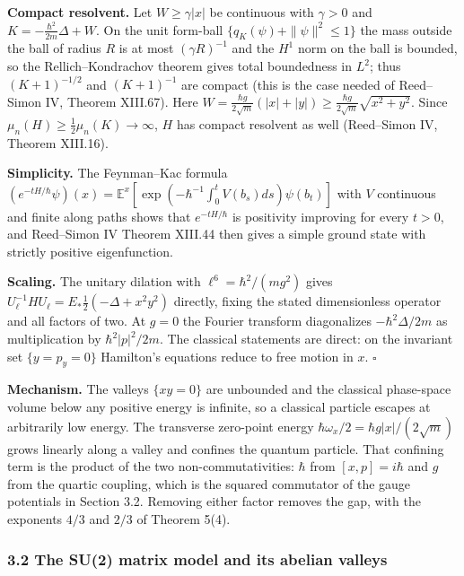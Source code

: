 \documentclass[11pt,a4paper]{article}
\begin{document}
\textbf{Compact resolvent.} Let \(W\ge\gamma|x|\) be continuous with
\(\gamma>0\) and \(K=-\frac{\hbar^2}{2m}\Delta+W\). On the unit
form-ball \(\{q_K(\psi)+\|\psi\|^2\le1\}\) the mass outside the ball of
radius \(R\) is at most \((\gamma R)^{-1}\) and the \(H^1\) norm on the
ball is bounded, so the Rellich--Kondrachov theorem gives total
boundedness in \(L^2\); thus \((K+1)^{-1/2}\) and \((K+1)^{-1}\) are
compact (this is the case needed of Reed--Simon IV, Theorem XIII.67).
Here
\(W=\frac{\hbar g}{2\sqrt m}(|x|+|y|) \ge\frac{\hbar g}{2\sqrt m}\sqrt{x^2+y^2}\).
Since \(\mu_n(H)\ge\tfrac12\mu_n(K) \to\infty\), \(H\) has compact
resolvent as well (Reed--Simon IV, Theorem XIII.16).

\textbf{Simplicity.} The Feynman--Kac formula
\((e^{-tH/\hbar}\psi)(x)=\mathbb E^x[\exp(-\hbar^{-1}\int_0^tV(b_s)ds)\psi(b_t)]\)
with \(V\) continuous and finite along paths shows that
\(e^{-tH/\hbar}\) is positivity improving for every \(t>0\), and
Reed--Simon IV Theorem XIII.44 then gives a simple ground state with
strictly positive eigenfunction.

\textbf{Scaling.} The unitary dilation with \(\ell^6=\hbar^2/(mg^2)\)
gives \(U_\ell^{-1}HU_\ell={E_*}\tfrac12(-\Delta+x^2y^2)\) directly,
fixing the stated dimensionless operator and all factors of two. At
\(g=0\) the Fourier transform diagonalizes \(-\hbar^2\Delta/2m\) as
multiplication by \(\hbar^2|p|^2/2m\). The classical statements are
direct: on the invariant set \(\{y=p_y=0\}\) Hamilton's equations reduce
to free motion in \(x\). \(\square\)

\textbf{Mechanism.} The valleys \(\{xy=0\}\) are unbounded and the
classical phase-space volume below any positive energy is infinite, so a
classical particle escapes at arbitrarily low energy. The transverse
zero-point energy \(\hbar\omega_x/2=\hbar g|x|/(2\sqrt m)\) grows
linearly along a valley and confines the quantum particle. That
confining term is the product of the two non-commutativities: \(\hbar\)
from \([x,p]=i\hbar\) and \(g\) from the quartic coupling, which is the
squared commutator of the gauge potentials in Section 3.2. Removing
either factor removes the gap, with the exponents \(4/3\) and \(2/3\) of
Theorem 5(4).

\hypertarget{the-su2-matrix-model-and-its-abelian-valleys}{%
\subsubsection{3.2 The SU(2) matrix model and its abelian
valleys}\label{the-su2-matrix-model-and-its-abelian-valleys}}
\end{document}

